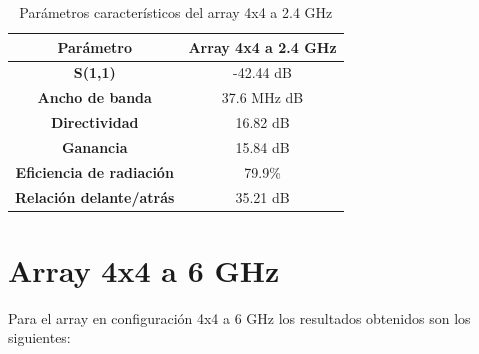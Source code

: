 \begin{table}[H]
  
   
   \small %
   \centering %
   \begin{tabular}{c c} %
   \toprule[\heavyrulewidth]\toprule[\heavyrulewidth]
   \textbf{Parámetro} & \textbf{Array 4x4 a 2.4 GHz} \\ 
   \midrule
   \textbf{S(1,1)} & -42.44 dB \\
   \textbf{Ancho de banda} & 37.6 MHz dB \\
   \textbf{Directividad} & 16.82 dB \\
   \textbf{Ganancia} & 15.84 dB \\
   \textbf{Eficiencia de radiación} & 79.9\% \\
   \textbf{Relación delante/atrás} & 35.21 dB \\

   \bottomrule[\heavyrulewidth] 
   \end{tabular}
   
   \caption{Parámetros característicos del array 4x4 a 2.4 GHz} 
   \label{tab:res4x41}
\end{table}






































\section{Array 4x4 a 6 GHz}
\par Para el array en configuración 4x4 a 6 GHz los resultados obtenidos son los siguientes:

